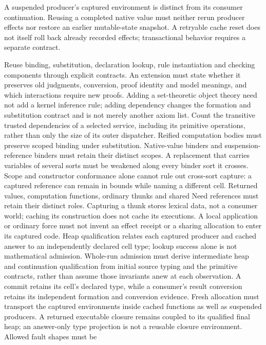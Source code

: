 \documentclass[11pt]{article}
\theoremstyle{definition}
\theoremstyle{remark}
\begin{document}
\begin{description}[leftmargin=1.2cm,style=nextline]
  A suspended producer's captured environment is distinct from its consumer
  continuation. Reusing a completed native value must neither rerun producer
  effects nor restore an earlier mutable-state snapshot. A retryable cache
  reset does not itself roll back already recorded effects; transactional
  behavior requires a separate contract.
\item[KG7: Reusable kernel components.]
  Reuse binding, substitution, declaration lookup, rule instantiation and
  checking components through explicit contracts. An extension must state
  whether it preserves old judgments, conversion, proof identity and model
  meanings, and which interactions require new proofs. Adding a set-theoretic
  object theory need not add a kernel inference rule; adding dependency changes
  the formation and substitution contract and is not merely another axiom list.
  Count the transitive trusted dependencies of a selected service, including
  its primitive operations, rather than only the size of its outer dispatcher.
  Reified computation bodies must preserve scoped binding under substitution.
  Native-value binders and suspension-reference binders must retain their
  distinct scopes. A replacement that carries variables of several sorts
  must be weakened along every binder sort it crosses. Scope and constructor
  conformance alone cannot rule out cross-sort capture: a captured reference
  can remain in bounds while naming a different cell. Returned values,
  computation functions, ordinary thunks and shared Need references must
  retain their distinct roles. Capturing a thunk stores lexical data, not
  a consumer world; caching its construction does not cache its executions.
  A local application or ordinary force must not invent an effect receipt
  or a sharing allocation to enter its captured code. Heap qualification
  relates each captured producer and cached answer to an independently
  declared cell type; lookup success alone is not mathematical admission.
  Whole-run admission must derive intermediate heap and continuation
  qualification from initial source typing and the primitive contracts,
  rather than assume those invariants anew at each observation. A commit
  retains its cell's declared type, while a consumer's result conversion
  retains its independent formation and conversion evidence.
  Fresh allocation must transport the captured environments inside cached
  functions as well as suspended producers. A returned executable closure
  remains coupled to its qualified final heap; an answer-only type projection
  is not a reusable closure environment. Allowed fault shapes must be

\end{description}
\end{document}
